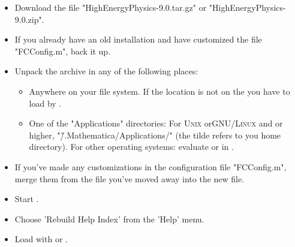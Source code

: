\begin{itemize}

\item{Download the file "HighEnergyPhysics-9.0.tar.gz" or
"HighEnergyPhysics-9.0.zip".}

\item{If you already have an old installation and have customized the file "FCConfig.m", back it up.}

\item{Unpack the archive in any of the following places:

\begin{itemize}

\item{Anywhere on your file system. If the location is not on the \mma {} you
have to load \fc by .}

\item{One of the \mma "Applications" directories: For \textsc{Unix} or\textsc{GNU/Linux} and  or higher, "\~/.Mathematica/Applications/" (the tilde refers to you home directory).
For other operating systems: evaluate  or  in \mma.}
\end{itemize}
}

\item{If you've made any customizations in the configuration file "FCConfig.m", merge them from the file you've moved away into the new file.}

\item{Start \mma.}

\item{Choose 'Rebuild Help Index' from the 'Help' menu.}

\item{Load \fc with  or .}

\end{itemize}




